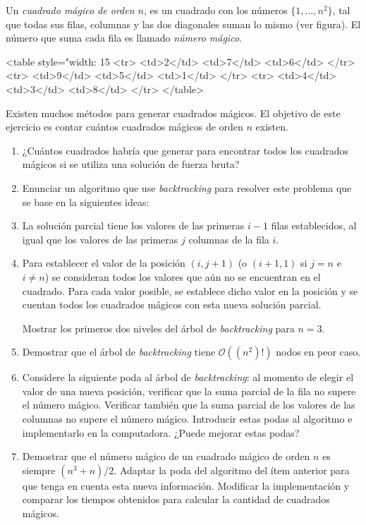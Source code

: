 
\item Un \emph{cuadrado mágico de orden $n$}, es un cuadrado con los números $\{1, \ldots, n^2\}$, tal que todas sus filas, columnas y las dos diagonales suman lo mismo (ver figura).  El número que suma cada fila es llamado \emph{número mágico}.

 
 <table style="width: 15%
   <tr>
     <td>2</td>
     <td>7</td>
     <td>6</td>
   </tr>
   <tr>
     <td>9</td>
     <td>5</td>
     <td>1</td>
   </tr>
   <tr>
     <td>4</td>
     <td>3</td>
     <td>8</td>
   </tr>
</table>


 Existen muchos métodos para generar cuadrados mágicos.  El objetivo de este ejercicio es contar cuántos cuadrados mágicos de orden $n$ existen.

 \begin{enumerate}
  \item ¿Cuántos cuadrados habría que generar para encontrar todos los cuadrados mágicos si se utiliza una solución de fuerza bruta?
  \item Enunciar un algoritmo que use \textit{backtracking} para resolver este problema que se base en la siguientes ideas:

   \item La solución parcial tiene los valores de las primeras $i-1$ filas establecidos, al igual que los valores de las primeras $j$ columnas de la fila $i$.
   \item Para establecer el valor de la posición $(i,j+1)$ (o $(i+1,1)$ si $j = n$ e $i \neq n$) se consideran todos los valores que aún no se encuentran en el cuadrado.  Para cada valor posible, se establece dicho valor en la posición y se cuentan todos los cuadrados mágicos con esta nueva solución parcial.

  Mostrar los primeros dos niveles del árbol de \textit{backtracking} para $n = 3$.

  \item Demostrar que el árbol de \textit{backtracking} tiene $\mathcal{O}((n^2)!)$ nodos en peor caso.
  \item\label{ej:magico:it:back} Considere la siguiente poda al árbol de \textit{backtracking}: al momento de elegir el valor de una nueva posición, verificar que la suma parcial de la fila no supere el número mágico.  Verificar también que la suma parcial de los valores de las columnas no supere el número mágico. Introducir estas podas al algoritmo e implementarlo en la computadora.  ¿Puede mejorar estas podas?
  \item\label{ej:magico:it:back2} Demostrar que el número mágico de un cuadrado mágico de orden $n$ es siempre $(n^3 + n)/2$. Adaptar la poda del algoritmo del ítem anterior para que tenga en cuenta esta nueva información.  Modificar la implementación y comparar los tiempos obtenidos para calcular la cantidad de cuadrados mágicos.
 \end{enumerate}

